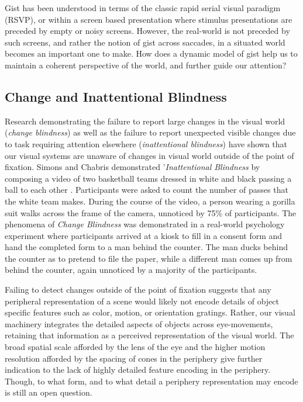 \documentclass[a4paper,10pt,final]{ThesisStyle}
\begin{document}
Gist has been understood in terms of the classic rapid serial visual paradigm (RSVP), or within a screen based presentation where stimulus presentations are preceded by empty or noisy screens.  However, the real-world is not preceded by such screens, and rather the notion of gist across saccades, in a situated world becomes an important one to make.  How does a dynamic model of gist help us to maintain a coherent perspective of the world, and further guide our attention?  

\subsection{Change and Inattentional Blindness}

Research demonstrating the failure to report large changes in the visual world (\textit{change blindness}) as well as the failure to report unexpected visible changes due to task requiring attention elsewhere (\textit{inattentional blindness}) \cite{Simons1999,Rensink2000,Rensink2001,Hollingworth2001a} have shown that our visual systems are unaware of changes in visual world outside of the point of fixation.  Simons and Chabris demonstrated '\textit{Inattentional Blindness} by composing a video of two basketball teams dressed in white and black passing a ball to each other \cite{Simons1999}.  Participants were asked to count the number of passes that the white team makes.  During the course of the video, a person wearing a gorilla suit walks across the frame of the camera, unnoticed by 75\% of participants.  The phenomena of \textit{Change Blindness} was demonstrated in a real-world psychology experiment \cite{Simons1998} where participants arrived at a kiosk to fill in a consent form and hand the completed form to a man behind the counter.  The man ducks behind the counter as to pretend to file the paper, while a different man comes up from behind the counter, again unnoticed by a majority of the participants.  

Failing to detect changes outside of the point of fixation suggests that any peripheral representation of a scene would likely not encode details of object specific features such as color, motion, or orientation gratings.  Rather, our visual machinery integrates the detailed aspects of objects across eye-movements, retaining that information as a perceived representation of the visual world.  The broad spatial scale afforded by the lens of the eye and the higher motion resolution afforded by the spacing of cones in the periphery give further indication to the lack of highly detailed feature encoding in the periphery.  Though, to what form, and to what detail a periphery representation may encode is still an open question.  
\end{document}
